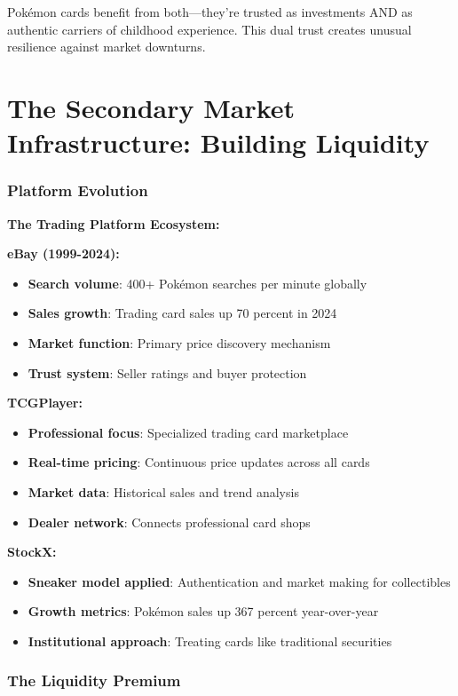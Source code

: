 \documentclass[11pt,oneside]{book}
\begin{document}
{{{{{{Pokémon cards benefit from both—they're trusted as investments AND as authentic carriers of childhood experience. This dual trust creates unusual resilience against market downturns.

\section{The Secondary Market Infrastructure: Building Liquidity}

\subsubsection{Platform Evolution}

\textbf{The Trading Platform Ecosystem:}

\textbf{eBay (1999-2024):}
\begin{itemize}
\item \textbf{Search volume}: 400+ Pokémon searches per minute globally
\item \textbf{Sales growth}: Trading card sales up 70 percent in 2024
\item \textbf{Market function}: Primary price discovery mechanism
\item \textbf{Trust system}: Seller ratings and buyer protection
\end{itemize}

\textbf{TCGPlayer:}
\begin{itemize}
\item \textbf{Professional focus}: Specialized trading card marketplace
\item \textbf{Real-time pricing}: Continuous price updates across all cards
\item \textbf{Market data}: Historical sales and trend analysis
\item \textbf{Dealer network}: Connects professional card shops
\end{itemize}

\textbf{StockX:}
\begin{itemize}
\item \textbf{Sneaker model applied}: Authentication and market making for collectibles
\item \textbf{Growth metrics}: Pokémon sales up 367 percent year-over-year
\item \textbf{Institutional approach}: Treating cards like traditional securities
\end{itemize}

\subsubsection{The Liquidity Premium}

}}}}}}
\end{document}
